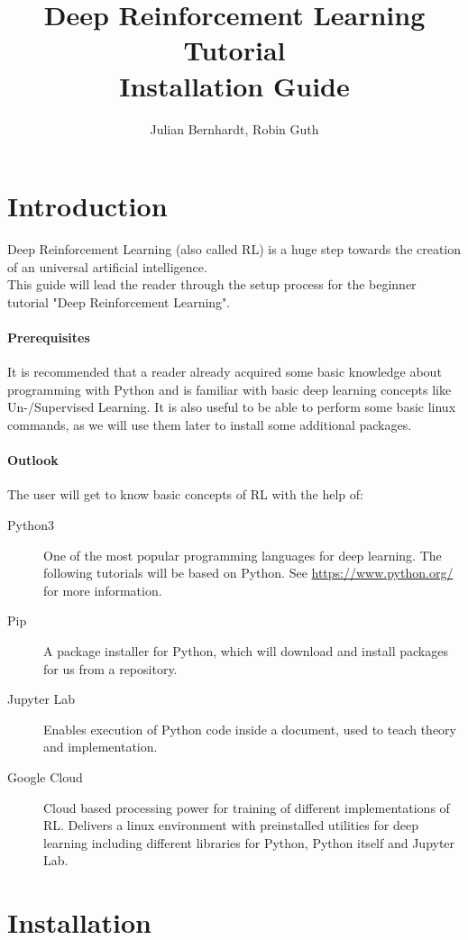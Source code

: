\documentclass[a4paper]{article}
\title{Deep Reinforcement Learning Tutorial \\Installation Guide}
\author{Julian Bernhardt, Robin Guth}
\begin{document}
\maketitle
\tableofcontents

\section{Introduction}
Deep Reinforcement Learning (also called RL) is a huge step towards the creation of an universal artificial intelligence.\\ %
This guide will lead the reader through the setup process for the beginner tutorial "Deep Reinforcement Learning". 
\paragraph{Prerequisites}
It is recommended that a reader already acquired some basic knowledge about programming with Python and is familiar with basic deep learning concepts like Un-/Supervised Learning. It is also useful to be able to perform some basic linux commands, as we will use them later to install some additional packages.
\paragraph{Outlook}
The user will get to know basic concepts of RL with the help of:
\begin{description}
	\item[Python3] One of the most popular programming languages for deep learning. The following tutorials will be based on Python. See \url{https://www.python.org/} for more information.
	\item[Pip] A package installer for Python, which will download and install packages for us from a repository.
	\item[Jupyter Lab] Enables execution of Python code inside a document, used to teach theory and implementation. 
	\item[Google Cloud] Cloud based processing power for training of different implementations of RL. Delivers a linux environment with preinstalled utilities for deep learning including different libraries for Python, Python itself and Jupyter Lab.
\end{description}  
\section{Installation}
\end{document}
